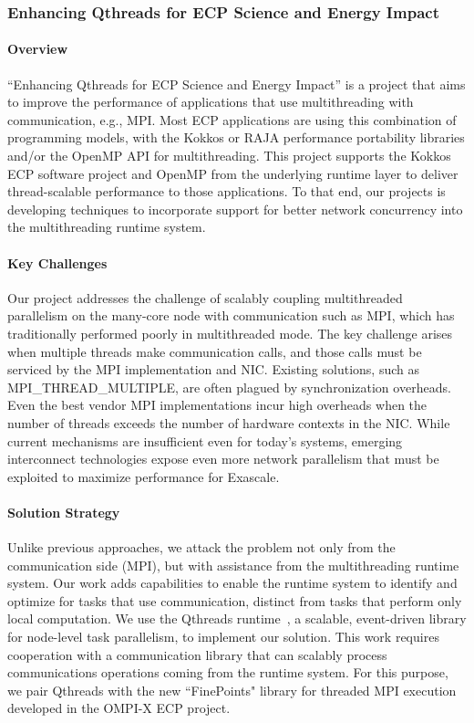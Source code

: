\subsubsection{ Enhancing Qthreads for ECP Science and Energy Impact} 


\paragraph{Overview} 

``Enhancing Qthreads for ECP Science and Energy Impact'' is a project that aims to improve the performance of applications that use multithreading with communication, e.g., MPI.  Most ECP applications are using this combination of programming models, with the Kokkos or RAJA performance portability libraries and/or the OpenMP API for multithreading.  This project supports the Kokkos ECP software project and OpenMP from the underlying runtime layer to deliver thread-scalable performance to those applications.  To that end, our projects is developing techniques to incorporate support for better network concurrency into the multithreading runtime system.

\paragraph{Key  Challenges}
Our project addresses the challenge of scalably coupling multithreaded parallelism on the many-core node with communication such as MPI, which has traditionally performed poorly in multithreaded mode.  The key challenge arises when multiple threads make communication calls, and those calls must be serviced by the MPI implementation and NIC.  Existing solutions, such as MPI\_THREAD\_MULTIPLE, are often plagued by synchronization overheads.  Even the best vendor MPI implementations incur high overheads when the number of threads exceeds the number of hardware contexts in the NIC. 
While current mechanisms are insufficient even for today's systems, emerging interconnect technologies expose even more network parallelism that must be exploited to maximize performance for Exascale.

\paragraph{Solution Strategy}

Unlike previous approaches, we attack the problem not only from the communication side (MPI), but with assistance from the multithreading runtime system.  Our work adds capabilities to enable the runtime system to identify and optimize for tasks that use communication, distinct from tasks that perform only local computation.  We use the Qthreads runtime~\cite{wheeler2008qthreads}, a scalable, event-driven library for node-level task parallelism, to implement our solution.  This work requires cooperation with a communication library that can scalably process communications operations coming from the runtime system.  For this purpose, we pair Qthreads with the new “FinePoints" library for threaded MPI execution developed in the OMPI-X ECP project.

